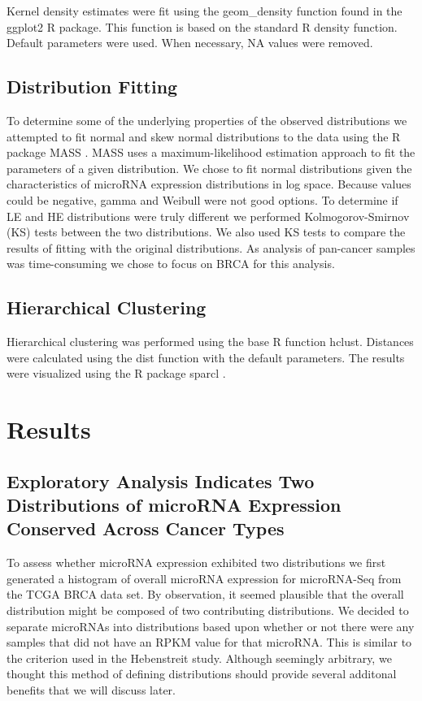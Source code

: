 \documentclass[12pt]{report}
\begin{document}
Kernel density estimates were fit using the geom\_density function found in the ggplot2 R package. This function is based on the standard R density function.
Default parameters were used. When necessary, NA values were removed.

\subsection*{Distribution Fitting}
 To determine some of the underlying properties of the observed distributions we attempted to fit normal and skew normal distributions to the data using the R package MASS \cite{mass}. MASS uses
 a maximum-likelihood estimation approach to fit the parameters of a given distribution. We chose to fit normal  distributions given the characteristics of
 microRNA expression distributions in log space.
 Because values could be negative, gamma and Weibull were not good options. To determine if LE and HE distributions were truly different we performed
 Kolmogorov-Smirnov (KS) tests between the two distributions. We also used KS tests to compare the results of fitting with the original distributions. As analysis of pan-cancer samples was time-consuming
 we chose to focus on BRCA for this analysis.

\subsection*{Hierarchical Clustering}
Hierarchical clustering was performed using the base R function hclust. Distances were calculated using the dist function with the default parameters. The results were visualized using
the R package sparcl \cite{sparcl}.

\section*{Results}
\subsection*{Exploratory Analysis Indicates Two Distributions of microRNA Expression Conserved Across Cancer Types}
To assess whether microRNA expression exhibited two distributions we first generated a histogram of overall microRNA expression
for microRNA-Seq from the TCGA BRCA data set. By observation, it seemed plausible that the overall distribution might be composed of two contributing distributions.
We decided to separate microRNAs into distributions based upon whether or not there were any samples that did not have an RPKM value for that microRNA.
This is similar to the criterion used in the Hebenstreit study. Although seemingly arbitrary, we thought this method of defining distributions should
provide several additonal benefits that we will discuss later. %
\end{document}

